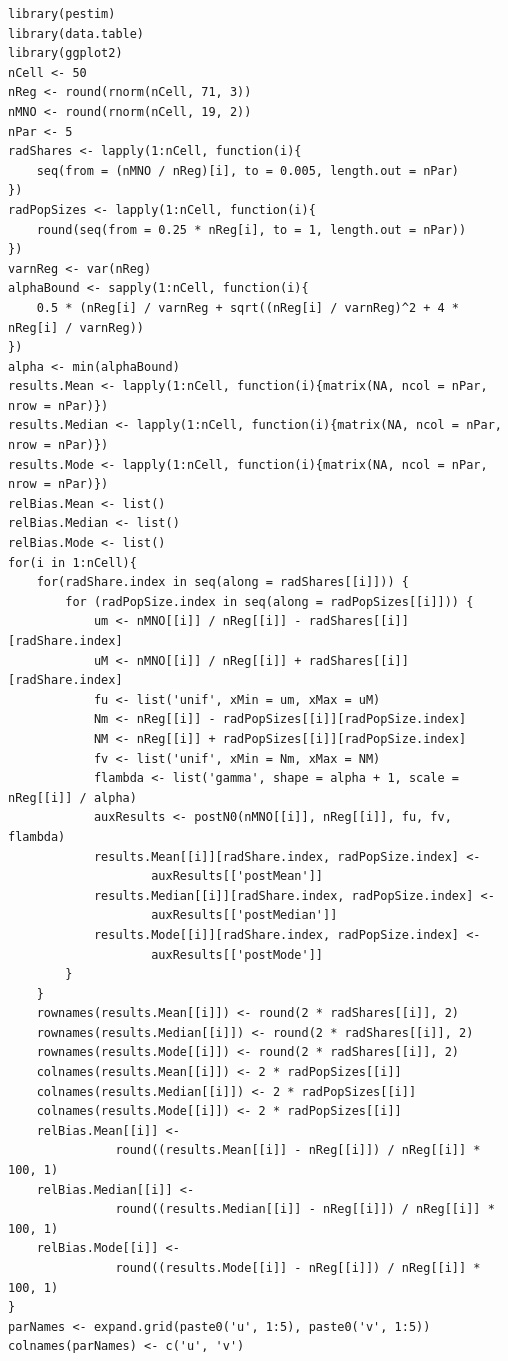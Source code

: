 \documentclass[12pt, a4paper]{article}
\begin{document}
\begin{verbatim}
library(pestim)
library(data.table)
library(ggplot2)
nCell <- 50
nReg <- round(rnorm(nCell, 71, 3))
nMNO <- round(rnorm(nCell, 19, 2))
nPar <- 5
radShares <- lapply(1:nCell, function(i){
    seq(from = (nMNO / nReg)[i], to = 0.005, length.out = nPar)
})
radPopSizes <- lapply(1:nCell, function(i){
    round(seq(from = 0.25 * nReg[i], to = 1, length.out = nPar))
})
varnReg <- var(nReg)
alphaBound <- sapply(1:nCell, function(i){
    0.5 * (nReg[i] / varnReg + sqrt((nReg[i] / varnReg)^2 + 4 * nReg[i] / varnReg))
})
alpha <- min(alphaBound)
results.Mean <- lapply(1:nCell, function(i){matrix(NA, ncol = nPar, nrow = nPar)})
results.Median <- lapply(1:nCell, function(i){matrix(NA, ncol = nPar, nrow = nPar)})
results.Mode <- lapply(1:nCell, function(i){matrix(NA, ncol = nPar, nrow = nPar)})
relBias.Mean <- list()
relBias.Median <- list()
relBias.Mode <- list()
for(i in 1:nCell){
    for(radShare.index in seq(along = radShares[[i]])) {
        for (radPopSize.index in seq(along = radPopSizes[[i]])) {
            um <- nMNO[[i]] / nReg[[i]] - radShares[[i]][radShare.index]
            uM <- nMNO[[i]] / nReg[[i]] + radShares[[i]][radShare.index]
            fu <- list('unif', xMin = um, xMax = uM)
            Nm <- nReg[[i]] - radPopSizes[[i]][radPopSize.index]
            NM <- nReg[[i]] + radPopSizes[[i]][radPopSize.index]
            fv <- list('unif', xMin = Nm, xMax = NM)
            flambda <- list('gamma', shape = alpha + 1, scale = nReg[[i]] / alpha)
            auxResults <- postN0(nMNO[[i]], nReg[[i]], fu, fv, flambda)
            results.Mean[[i]][radShare.index, radPopSize.index] <- 
                    auxResults[['postMean']] 
            results.Median[[i]][radShare.index, radPopSize.index] <- 
                    auxResults[['postMedian']]
            results.Mode[[i]][radShare.index, radPopSize.index] <- 
                    auxResults[['postMode']]
        }
    }
    rownames(results.Mean[[i]]) <- round(2 * radShares[[i]], 2)
    rownames(results.Median[[i]]) <- round(2 * radShares[[i]], 2)
    rownames(results.Mode[[i]]) <- round(2 * radShares[[i]], 2)
    colnames(results.Mean[[i]]) <- 2 * radPopSizes[[i]]
    colnames(results.Median[[i]]) <- 2 * radPopSizes[[i]]
    colnames(results.Mode[[i]]) <- 2 * radPopSizes[[i]]
    relBias.Mean[[i]] <- 
               round((results.Mean[[i]] - nReg[[i]]) / nReg[[i]] * 100, 1)
    relBias.Median[[i]] <- 
               round((results.Median[[i]] - nReg[[i]]) / nReg[[i]] * 100, 1)
    relBias.Mode[[i]] <- 
               round((results.Mode[[i]] - nReg[[i]]) / nReg[[i]] * 100, 1)
}
parNames <- expand.grid(paste0('u', 1:5), paste0('v', 1:5))
colnames(parNames) <- c('u', 'v')


\end{verbatim}
\end{document}
